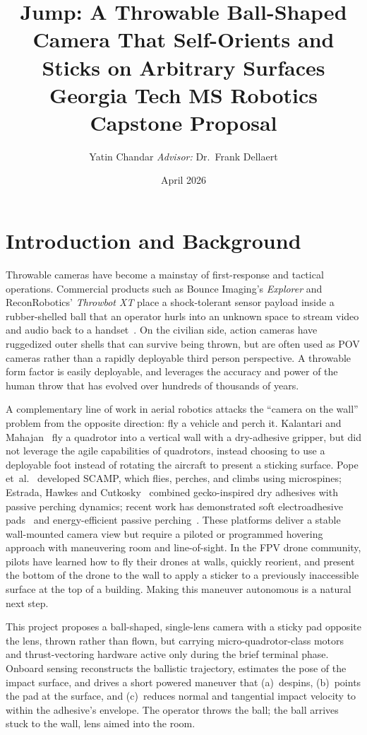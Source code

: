 \documentclass[11pt]{article}
\title{\vspace{-2em}\textbf{Jump: A Throwable Ball-Shaped Camera That Self-Orients and Sticks on Arbitrary Surfaces}\\
\large Georgia Tech MS Robotics Capstone Proposal\vspace{-0.5em}}
\author{Yatin Chandar \quad \textit{Advisor:} Dr.\ Frank Dellaert\vspace{-0.8em}}
\date{April 2026}
\begin{document}
\maketitle

\section{Introduction and Background}

Throwable cameras have become a mainstay of first-response and
tactical operations. Commercial products such as Bounce Imaging's
\emph{Explorer} and ReconRobotics' \emph{Throwbot XT} place a shock-tolerant
sensor payload inside a rubber-shelled ball that an operator hurls into an
unknown space to stream video and audio back to a
handset~\cite{bounce_mit,bounce_newatlas,dhs_throwable}. On the civilian side, action cameras have 
ruggedized outer shells that can survive being thrown, but are often used as POV cameras rather than a 
rapidly deployable third person perspective. A throwable form factor is easily deployable, and leverages the accuracy
and power of the human throw that has evolved over hundreds of thousands of years.

A complementary line of work in aerial robotics attacks the ``camera on the
wall'' problem from the opposite direction: fly a vehicle and perch it.
Kalantari and Mahajan~\cite{kalantari2015} fly a quadrotor into a vertical
wall with a dry-adhesive gripper, but did not leverage the agile capabilities of quadrotors, instead choosing to use a deployable foot instead of rotating the aircraft to present a sticking surface. 
Pope et~al.~\cite{pope2017scamp} developed
SCAMP, which flies, perches, and climbs using microspines; Estrada, Hawkes
and Cutkosky~\cite{estrada2014} combined gecko-inspired dry adhesives with
passive perching dynamics; recent work has demonstrated soft electroadhesive
pads~\cite{electroadhesive2026} and energy-efficient passive
perching~\cite{nature2023}. These platforms deliver a stable wall-mounted
camera view but require a piloted or programmed hovering approach with
maneuvering room and line-of-sight. In the FPV drone community, pilots have learned how to fly their 
drones at walls, quickly reorient, and present the bottom of the drone to the wall to apply a sticker to a previously 
inaccessible surface at the top of a building. Making this maneuver autonomous is a natural next step.

This project proposes a ball-shaped, single-lens
camera with a sticky pad opposite the lens, thrown rather than flown, but
carrying micro-quadrotor-class motors and thrust-vectoring hardware active only during
the brief terminal phase. Onboard sensing reconstructs the ballistic
trajectory, estimates the pose of the impact surface, and drives a short
powered maneuver that (a)~despins, (b)~points the pad at the surface, and
(c)~reduces normal and tangential impact velocity to within the adhesive's
envelope. The operator throws the ball; the ball arrives stuck to the wall,
lens aimed into the room.
\end{document}
